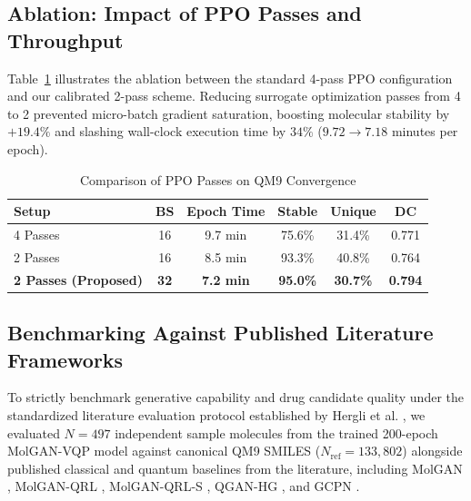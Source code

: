 \documentclass[conference]{IEEEtran}
\begin{document}
\subsection{Ablation: Impact of PPO Passes and Throughput}
Table~\ref{tab:ablation} illustrates the ablation between the standard 4-pass PPO configuration and our calibrated 2-pass scheme. Reducing surrogate optimization passes from 4 to 2 prevented micro-batch gradient saturation, boosting molecular stability by $+19.4\%$ and slashing wall-clock execution time by $34\%$ ($9.72 \to 7.18$ minutes per epoch).

\begin{table}[htbp]
\caption{Comparison of PPO Passes on QM9 Convergence}
\begin{center}
\setlength{\tabcolsep}{3.5pt}
\begin{tabular}{lccccc}
\toprule
\textbf{Setup} & \textbf{BS} & \textbf{Epoch Time} & \textbf{Stable} & \textbf{Unique} & \textbf{DC} \\
\midrule
4 Passes & 16 & 9.7 min & 75.6\% & 31.4\% & 0.771 \\
2 Passes & 16 & 8.5 min & 93.3\% & 40.8\% & 0.764 \\
\textbf{2 Passes (Proposed)} & \textbf{32} & \textbf{7.2 min} & \textbf{95.0\%} & \textbf{30.7\%} & \textbf{0.794} \\
\bottomrule
\end{tabular}
\label{tab:ablation}
\end{center}
\end{table}

\subsection{Benchmarking Against Published Literature Frameworks}
To strictly benchmark generative capability and drug candidate quality under the standardized literature evaluation protocol established by Hergli et al. \cite{hergli2026}, we evaluated $N=497$ independent sample molecules from the trained 200-epoch MolGAN-VQP model against canonical QM9 SMILES ($N_{\text{ref}}=133,802$) alongside published classical and quantum baselines from the literature, including MolGAN \cite{decao2018molgan}, MolGAN-QRL \cite{hergli2026}, MolGAN-QRL-S \cite{hergli2026}, QGAN-HG \cite{hergli2026}, and GCPN \cite{you2018graph}.
\end{document}
